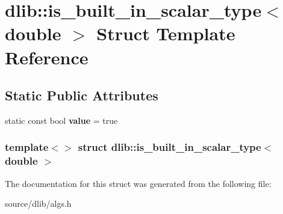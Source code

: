 \hypertarget{structdlib_1_1is__built__in__scalar__type_3_01double_01_4}{
\section{dlib::is\_\-built\_\-in\_\-scalar\_\-type$<$ double $>$ Struct Template Reference}
\label{structdlib_1_1is__built__in__scalar__type_3_01double_01_4}
}
\subsection*{Static Public Attributes}
\begin{DoxyCompactItemize}
\item 
\hypertarget{structdlib_1_1is__built__in__scalar__type_3_01double_01_4_a7b6873f42f78049c4fd84d7418fe03bf}{
static const bool {\bfseries value} = true}
\label{structdlib_1_1is__built__in__scalar__type_3_01double_01_4_a7b6873f42f78049c4fd84d7418fe03bf}

\end{DoxyCompactItemize}
\subsubsection*{template$<$$>$ struct dlib::is\_\-built\_\-in\_\-scalar\_\-type$<$ double $>$}



The documentation for this struct was generated from the following file:\begin{DoxyCompactItemize}
\item 
source/dlib/algs.h\end{DoxyCompactItemize}
